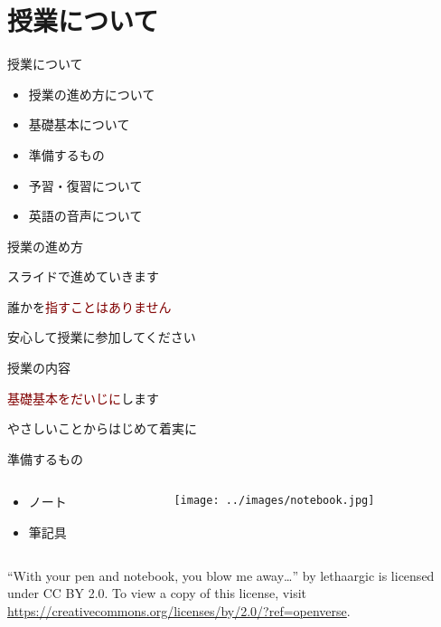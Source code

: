 \documentclass[
  ignorenonframetext,
  aspectratio=169,
  xcolor=dvipsnames]{beamer}
\providecommand{\tightlist}{%
  \setlength{\itemsep}{0pt}\setlength{\parskip}{0pt}}
\begin{document}
\section{授業について}\label{ux6388ux696dux306bux3064ux3044ux3066}

\begin{frame}{授業について}
\label{ux6388ux696dux306bux3064ux3044ux3066-1}
\LARGE

\begin{itemize}[<+->]
\tightlist
\item
  授業の進め方について
\item
  基礎基本について
\item
  準備するもの
\item
  予習・復習について
\item
  英語の音声について
\end{itemize}
\end{frame}

\begin{frame}{授業の進め方}
\label{ux6388ux696dux306eux9032ux3081ux65b9}
\LARGE

スライドで進めていきます

\pause
\vfill

\raggedleft

誰かを\textcolor{Maroon}{指すことはありません}

\pause

安心して授業に参加してください
\end{frame}

\begin{frame}{授業の内容}
\label{ux6388ux696dux306eux5185ux5bb9}
\LARGE

\textcolor{Maroon}{基礎基本をだいじに}します

\vfill

\raggedleft

やさしいことからはじめて着実に
\end{frame}

\begin{frame}{準備するもの}
\label{ux6e96ux5099ux3059ux308bux3082ux306e}
\LARGE
\begin{columns}
\begin{column}{.25\textwidth}
  \begin{itemize}
    \item ノート
    \item 筆記具
  \end{itemize}
\end{column}
\begin{column}{.7\textwidth}
\raggedleft
\texttt{[image: ../images/notebook.jpg]}
\end{column}
\end{columns}
\tiny
\raggedleft

``With your pen and notebook, you blow me away\ldots{}'' by lethaargic
is licensed under CC BY 2.0. To view a copy of this license, visit
\url{https://creativecommons.org/licenses/by/2.0/?ref=openverse}.
\end{frame}
\end{document}
